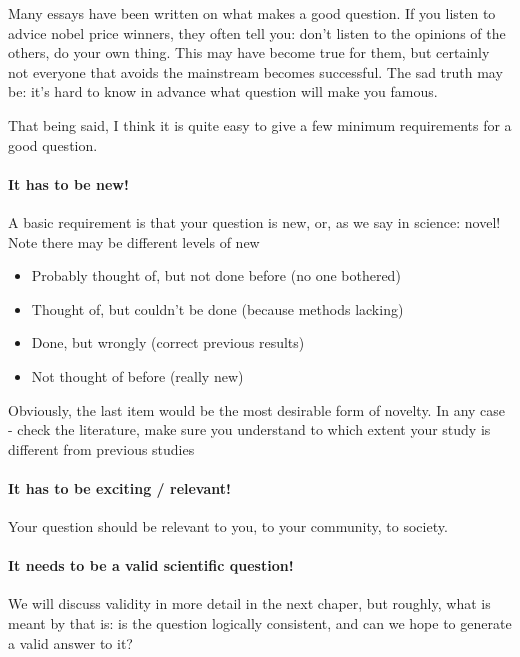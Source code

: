\documentclass{tufte-book}
\begin{document}
Many essays have been written on what makes a good question. If you listen to advice nobel price winners, they often tell you: don't listen to the opinions of the others, do your own thing. This may have become true for them, but certainly not everyone that avoids the mainstream becomes successful. The sad truth may be: it's hard to know in advance what question will make you famous.

That being said, I think it is quite easy to give a few minimum requirements for a good question. 


\paragraph{It has to be new!} A basic requirement is that your question is new, or, as we say in science: novel! Note there may be different levels of new

\begin{itemize}
\item Probably thought of, but not done before (no one bothered)
\item Thought of, but couldn’t be done (because methods lacking)
\item Done, but wrongly (correct previous results)
\item Not thought of before (really new)
\end{itemize}

Obviously, the last item would be the most desirable form of novelty. In any case - check the literature, make sure you understand to which extent your study is different from previous studies

\paragraph{It has to be exciting / relevant!} Your question should be relevant to you, to your community, to society. 

\paragraph{It needs to be a valid scientific question!} We will discuss validity in more detail in the next chaper, but roughly, what is meant by that is: is the question logically consistent, and can we hope to generate a valid answer to it?
\end{document}
